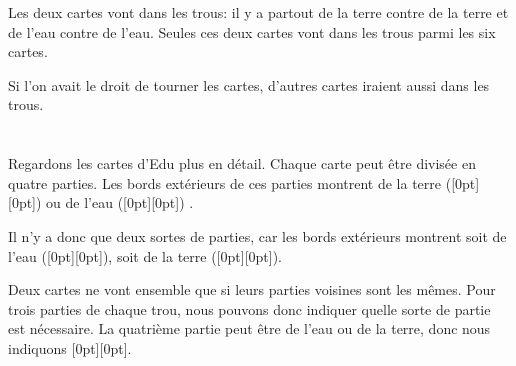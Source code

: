 {{{\centering%
\par}

Les deux cartes vont dans les trous: il y a partout de la terre contre de la terre et de l’eau contre de l’eau. Seules ces deux cartes vont dans les trous parmi les six cartes.

Si l’on avait le droit de tourner les cartes, d’autres cartes iraient aussi dans les trous.



\section*{\BrochureItsInformatics}
Regardons les cartes d’Edu plus en détail. Chaque carte peut être divisée en quatre parties. Les bords extérieurs de ces parties montrent de la terre (\raisebox{-0.5ex}[0pt][0pt]{}) ou de l’eau (\raisebox{-0.5ex}[0pt][0pt]{}) .

{\centering%
\par}

Il n’y a donc que deux sortes de parties, car les bords extérieurs montrent soit de l’eau (\raisebox{-0.5ex}[0pt][0pt]{}), soit de la terre (\raisebox{-0.5ex}[0pt][0pt]{}).

{\centering%
\par}

Deux cartes ne vont ensemble que si leurs parties voisines sont les mêmes. Pour trois parties de chaque trou, nous pouvons donc indiquer quelle sorte de partie est nécessaire. La quatrième partie peut être de l’eau ou de la terre, donc nous indiquons \raisebox{-0.5ex}[0pt][0pt]{}.

}}
